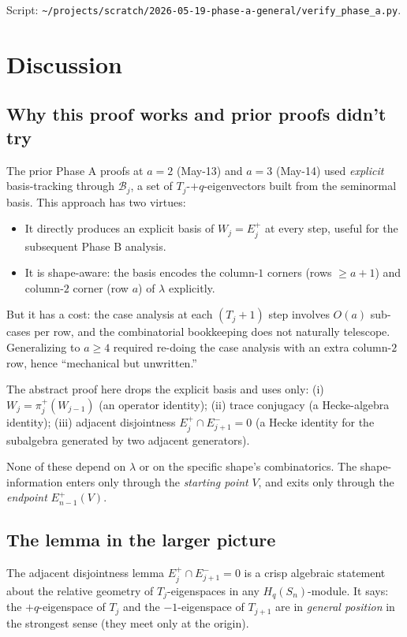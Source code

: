 \documentclass[11pt]{article}
\theoremstyle{definition}
\begin{document}
Script: \texttt{\textasciitilde/projects/scratch/2026-05-19-phase-a-general/verify\_phase\_a.py}.

\section{Discussion}\label{sec:discuss}

\subsection{Why this proof works and prior proofs didn't try}

The prior Phase A proofs at $a = 2$ (May-13) and $a = 3$ (May-14)
used \emph{explicit} basis-tracking through $\mathcal{B}_j$, a set
of $T_j$-$+q$-eigenvectors built from the seminormal basis.  This
approach has two virtues:
\begin{itemize}[leftmargin=2em,topsep=0.3em,itemsep=0.2em]
\item It directly produces an explicit basis of $W_j = E_j^+$ at
every step, useful for the subsequent Phase B analysis.
\item It is shape-aware: the basis encodes the column-$1$ corners
(rows $\ge a+1$) and column-$2$ corner (row $a$) of $\lambda$
explicitly.
\end{itemize}
But it has a cost: the case analysis at each $(T_j+1)$ step involves
$O(a)$ sub-cases per row, and the combinatorial bookkeeping does
not naturally telescope.  Generalizing to $a \ge 4$ required
re-doing the case analysis with an extra column-$2$ row, hence
``mechanical but unwritten.''

The abstract proof here drops the explicit basis and uses only:
(i) $W_j = \pi_j^+(W_{j-1})$ (an operator identity);
(ii) trace conjugacy (a Hecke-algebra identity);
(iii) adjacent disjointness $E_j^+ \cap E_{j+1}^- = 0$ (a Hecke
identity for the subalgebra generated by two adjacent generators).

None of these depend on $\lambda$ or on the specific shape's
combinatorics.  The shape-information enters only through the
\emph{starting point} $V$, and exits only through the
\emph{endpoint} $E_{n-1}^+(V)$.

\subsection{The lemma in the larger picture}

The adjacent disjointness lemma $E_j^+ \cap E_{j+1}^- = 0$ is a
crisp algebraic statement about the relative geometry of
$T_j$-eigenspaces in any $H_q(S_n)$-module.  It says: the
$+q$-eigenspace of $T_j$ and the $-1$-eigenspace of $T_{j+1}$ are
in \emph{general position} in the strongest sense (they meet only
at the origin).
\end{document}

